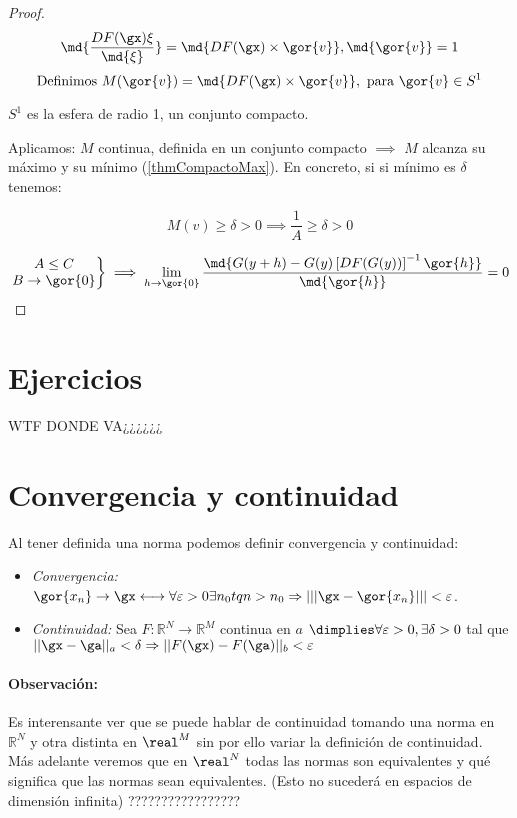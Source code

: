 \documentclass{apuntes}
\begin{document}
\begin{proof}
 
  $$\md{\frac{DF(\gx)\xi}{\md{\xi}}} = \md{DF(\gx)\times\gor{v}}, \md{\gor{v}} = 1$$
  $$\text{Definimos } M(\gor{v}) = \md{DF(\gx)\times\gor{v}}, \text{ para } \gor{v} \in S^1$$
  
  $S^1$ es la esfera de radio 1, un conjunto compacto.
  
  
  Aplicamos: $M$ continua, definida en un conjunto compacto $\implies$ $M$ alcanza su máximo y su mínimo (\ref{thmCompactoMax}). En concreto, si si mínimo es $\delta$ tenemos:
  
  $$ M(v)\geq \delta > 0 \implies \frac{1}{A}\geq \delta > 0 $$ 
  
  $$\left.\begin{matrix}A \leq C\\B \rightarrow \gor{0}\end{matrix}\right\} \implies \lim_{h \rightarrow \gor{0}}\frac{\md{G(y+h) - G(y) \left[DF(G(y))\right]^{-1} \gor{h}}}{\md{\gor{h}}} = 0$$
\end{proof}

       
        
        
\newpage
\section{Ejercicios}
%

\newpage
WTF DONDE VA¿¿¿¿¿¿
\section{Convergencia y continuidad}
Al tener definida una norma podemos definir convergencia y continuidad:
\begin{itemize}
 \item\emph{Convergencia:} $\gor{x_n} \rightarrow \gx \longleftrightarrow \forall \varepsilon > 0 \exists n_0 tq n>n_0 \Rightarrow |||\gx-\gor{x_n}|||<\varepsilon$.
 \item\emph{Continuidad:} Sea $F: \mathbb{R}^N \rightarrow \mathbb{R}^M$ continua en $a$ $\dimplies \forall \varepsilon > 0 , \exists \delta > 0$ tal que $||\gx-\ga||_a < \delta \Rightarrow ||F(\gx)-F(\ga)||_b< \varepsilon$
\end{itemize}
\paragraph{Observación:} Es interensante ver que se puede hablar de continuidad tomando una norma en $\mathbb{R}^N$ y otra distinta en $\real^M$ sin por ello variar la definición de continuidad. Más adelante veremos que en $\real^N$ todas las normas son equivalentes y qué significa que las normas sean equivalentes. (Esto no sucederá en espacios de dimensión infinita)
?????????????????




\newpage
\printindex
\end{document}
